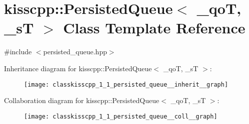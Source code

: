 \hypertarget{classkisscpp_1_1_persisted_queue}{\section{kisscpp\-:\-:Persisted\-Queue$<$ \-\_\-qo\-T, \-\_\-s\-T $>$ Class Template Reference}
\label{classkisscpp_1_1_persisted_queue}
}


{\ttfamily \#include $<$persisted\-\_\-queue.\-hpp$>$}



Inheritance diagram for kisscpp\-:\-:Persisted\-Queue$<$ \-\_\-qo\-T, \-\_\-s\-T $>$\-:
\nopagebreak
\begin{figure}[H]
\begin{center}
\leavevmode
\texttt{[image: classkisscpp\_1\_1\_persisted\_queue\_\_inherit\_\_graph]}
\end{center}
\end{figure}


Collaboration diagram for kisscpp\-:\-:Persisted\-Queue$<$ \-\_\-qo\-T, \-\_\-s\-T $>$\-:
\nopagebreak
\begin{figure}[H]
\begin{center}
\leavevmode
\texttt{[image: classkisscpp\_1\_1\_persisted\_queue\_\_coll\_\_graph]}
\end{center}
\end{figure}
